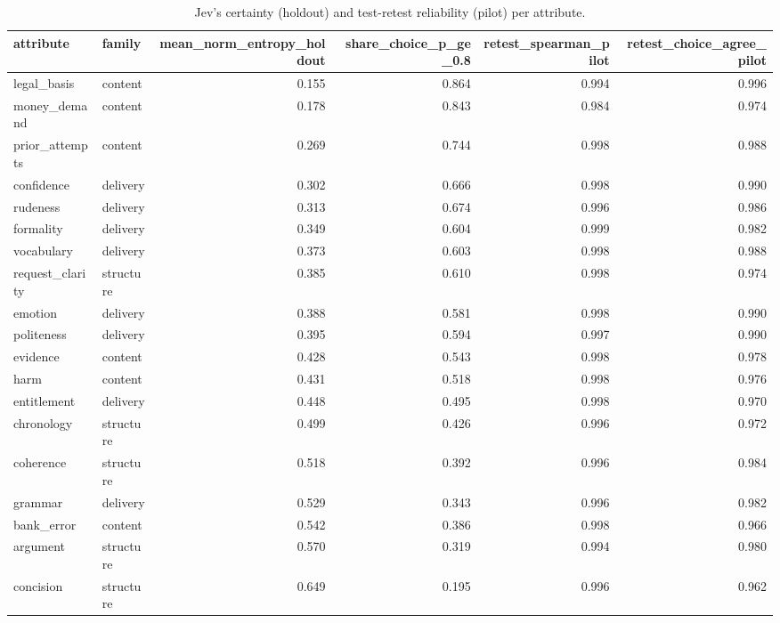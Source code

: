 \begin{table}
\caption{Jev's certainty (holdout) and test-retest reliability (pilot) per attribute.}
\label{tab:T5_attribute_certainty_reliability}
\begin{tabular}{llrrrr}
\toprule
attribute & family & mean\_norm\_entropy\_holdout & share\_choice\_p\_ge\_0.8 & retest\_spearman\_pilot & retest\_choice\_agree\_pilot \\
\midrule
legal\_basis & content & 0.155 & 0.864 & 0.994 & 0.996 \\
money\_demand & content & 0.178 & 0.843 & 0.984 & 0.974 \\
prior\_attempts & content & 0.269 & 0.744 & 0.998 & 0.988 \\
confidence & delivery & 0.302 & 0.666 & 0.998 & 0.990 \\
rudeness & delivery & 0.313 & 0.674 & 0.996 & 0.986 \\
formality & delivery & 0.349 & 0.604 & 0.999 & 0.982 \\
vocabulary & delivery & 0.373 & 0.603 & 0.998 & 0.988 \\
request\_clarity & structure & 0.385 & 0.610 & 0.998 & 0.974 \\
emotion & delivery & 0.388 & 0.581 & 0.998 & 0.990 \\
politeness & delivery & 0.395 & 0.594 & 0.997 & 0.990 \\
evidence & content & 0.428 & 0.543 & 0.998 & 0.978 \\
harm & content & 0.431 & 0.518 & 0.998 & 0.976 \\
entitlement & delivery & 0.448 & 0.495 & 0.998 & 0.970 \\
chronology & structure & 0.499 & 0.426 & 0.996 & 0.972 \\
coherence & structure & 0.518 & 0.392 & 0.996 & 0.984 \\
grammar & delivery & 0.529 & 0.343 & 0.996 & 0.982 \\
bank\_error & content & 0.542 & 0.386 & 0.998 & 0.966 \\
argument & structure & 0.570 & 0.319 & 0.994 & 0.980 \\
concision & structure & 0.649 & 0.195 & 0.996 & 0.962 \\
\bottomrule
\end{tabular}
\end{table}
